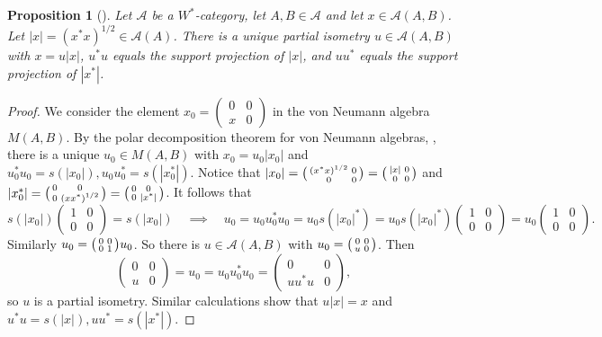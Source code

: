 \documentclass[a4paper,11pt]{article}
\theoremstyle{plain}
\newtheorem{proposition}{Proposition}[section]
\theoremstyle{remark}
\newcommand{\mc}[1]{\mathcal{#1}}
\newenvironment{smat}{\bigl(\begin{smallmatrix}}{\end{smallmatrix}\bigr)}
\begin{document}
\begin{proposition}[{\cite[Corollary~2.7]{GLR_Wstar_categories}}]\label{prop:Wstar_has_PD}
Let $\mc A$ be a $W^*$-category, let $A,B\in\mc A$ and let $x\in \mc A(A,B)$.  Let $|x| = (x^*x)^{1/2} \in \mc A(A)$.  There is a unique partial isometry $u\in\mc A(A,B)$ with $x = u|x|$, $u^*u$ equals the support projection of $|x|$, and $uu^*$ equals the support projection of $|x^*|$.
\end{proposition}
\begin{proof}
We consider the element $x_0 = \left(\begin{smallmatrix} 0 & 0 \\ x & 0 \end{smallmatrix}\right)$ in the von Neumann algebra $M(A,B)$.  By the polar decomposition theorem for von Neumann algebras, \cite[Theorem~1.12.1]{Sakai_Book}, there is a unique $u_0 \in M(A,B)$ with $x_0 = u_0 |x_0|$ and $u_0^*u_0 = s(|x_0|), u_0u_0^* = s(|x_0^*|)$.  Notice that $|x_0| = \begin{smat} (x^*x)^{1/2} & 0 \\ 0 & 0 \end{smat} = \begin{smat} |x| & 0 \\ 0 & 0 \end{smat}$ and $|x_0^*| = \begin{smat} 0 & 0 \\ 0 & (xx^*)^{1/2} \end{smat} = \begin{smat} 0 & 0 \\ 0 & |x^*| \end{smat}$.  It follows that
\[ s(|x_0|) \begin{pmatrix} 1 & 0 \\ 0 & 0 \end{pmatrix} = s(|x_0|)
\quad\implies\quad
u_0 = u_0 u_0^* u_0 = u_0 s(|x_0|^*)
= u_0 s(|x_0|^*) \begin{pmatrix} 1 & 0 \\ 0 & 0 \end{pmatrix}
= u_0 \begin{pmatrix} 1 & 0 \\ 0 & 0 \end{pmatrix}. \]
Similarly $u_0 = \begin{smat} 0 & 0 \\ 0 & 1 \end{smat} u_0$.  So there is $u\in \mc A(A,B)$ with $u_0 = \begin{smat} 0 & 0 \\ u & 0 \end{smat}$.  Then
\[ \begin{pmatrix} 0 & 0 \\ u & 0 \end{pmatrix} = u_0
= u_0 u_0^* u_0
= \begin{pmatrix} 0 & 0 \\ u u^* u & 0 \end{pmatrix}, \]
so $u$ is a partial isometry.  Similar calculations show that $u|x| = x$ and $u^*u = s(|x|), uu^* = s(|x^*|)$.


\end{proof}
\end{document}
